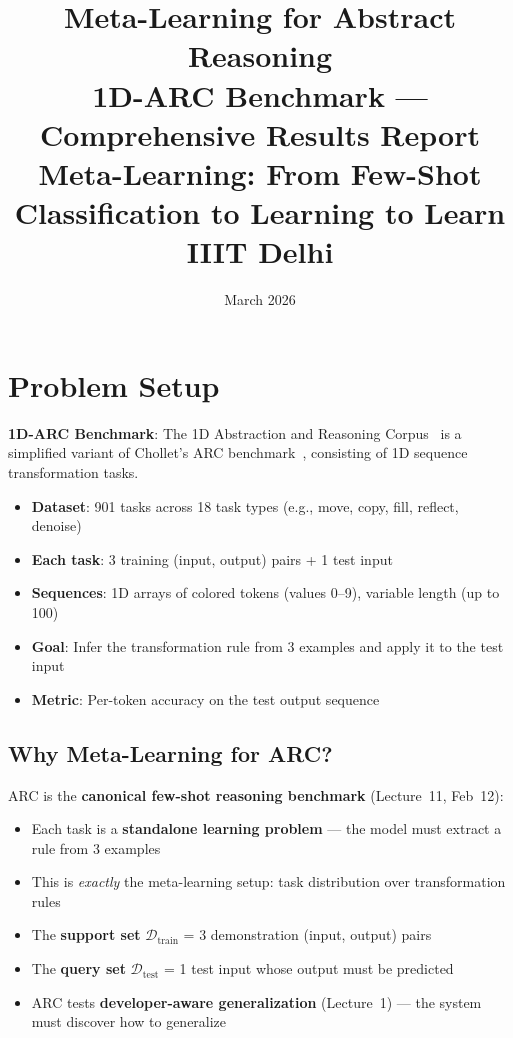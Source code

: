 \documentclass[11pt,a4paper]{article}
\title{\textbf{\LARGE Meta-Learning for Abstract Reasoning}\\[6pt]
\Large 1D-ARC Benchmark --- Comprehensive Results Report\\[12pt]
\large Meta-Learning: From Few-Shot Classification to Learning to Learn\\
IIIT Delhi}
\author{}
\date{March 2026}
\begin{document}
\maketitle
\thispagestyle{fancy}

\section{Problem Setup}

\textbf{1D-ARC Benchmark}: The 1D Abstraction and Reasoning Corpus~\cite{arc1d} is a simplified variant of Chollet's ARC benchmark~\cite{chollet2019}, consisting of 1D sequence transformation tasks.

\begin{itemize}[nosep]
    \item \textbf{Dataset}: 901 tasks across 18 task types (e.g., move, copy, fill, reflect, denoise)
    \item \textbf{Each task}: 3 training (input, output) pairs + 1 test input
    \item \textbf{Sequences}: 1D arrays of colored tokens (values 0--9), variable length (up to 100)
    \item \textbf{Goal}: Infer the transformation rule from 3 examples and apply it to the test input
    \item \textbf{Metric}: Per-token accuracy on the test output sequence
\end{itemize}

\subsection{Why Meta-Learning for ARC?}

ARC is the \textbf{canonical few-shot reasoning benchmark} (Lecture~11, Feb~12):
\begin{itemize}[nosep]
    \item Each task is a \textbf{standalone learning problem} --- the model must extract a rule from 3 examples
    \item This is \emph{exactly} the meta-learning setup: task distribution over transformation rules
    \item The \textbf{support set} $\mathcal{D}_{\text{train}}$ = 3 demonstration (input, output) pairs
    \item The \textbf{query set} $\mathcal{D}_{\text{test}}$ = 1 test input whose output must be predicted
    \item ARC tests \textbf{developer-aware generalization} (Lecture~1) --- the system must discover how to generalize
\end{itemize}
\end{document}
